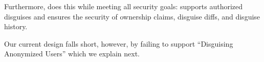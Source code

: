Furthermore, \sys does this while meeting all security goals: \sys supports authorized disguises and
ensures the security of ownership claims, disguise diffs, and disguise history.

Our current design falls short, however, by failing to support ``Disguising Anonymized
Users'' which we explain next.


